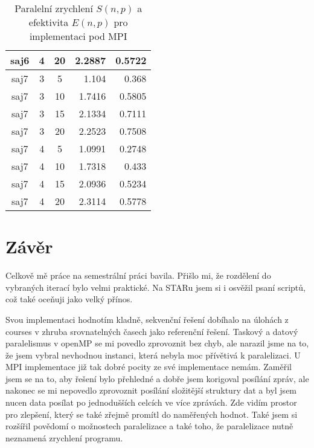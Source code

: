 \documentclass{article} \oddsidemargin=-5mm
\begin{document}
\begin{table}[h]
\begin{tabular}{|c|c|c|r|r|}
saj6                    & 4                        & 20                    & 2.2887          & 0.5722          \\ \hline
saj7                    & 3                        & 5                     & 1.104           & 0.368           \\ \hline
saj7                    & 3                        & 10                    & 1.7416          & 0.5805          \\ \hline
saj7                    & 3                        & 15                    & 2.1334          & 0.7111          \\ \hline
saj7                    & 3                        & 20                    & 2.2523          & 0.7508          \\ \hline
saj7                    & 4                        & 5                     & 1.0991          & 0.2748          \\ \hline
saj7                    & 4                        & 10                    & 1.7318          & 0.433           \\ \hline
saj7                    & 4                        & 15                    & 2.0936          & 0.5234          \\ \hline
saj7                    & 4                        & 20                    & 2.3114          & 0.5778          \\ \hline
\end{tabular}
\caption{Paralelní zrychlení $S(n,p)$ a efektivita $E(n,p)$ pro implementaci pod MPI}
\label{mpi-efectivity}
\end{table}

\clearpage

\section{Závěr}

Celkově mě práce na semestrální práci bavila. Přišlo mi, že rozdělení do vybraných iterací bylo velmi praktické. Na STARu jsem si i osvěžil psaní scriptů, což také oceňuji jako velký přínos.

Svou implementaci hodnotím kladně, sekvenční řešení dobíhalo na úlohách z courses v zhruba srovnatelných časech jako referenční řešení. Taskový a datový paralelismus v openMP se mi povedlo zprovoznit bez chyb, ale narazil jsme na to, že jsem vybral nevhodnou instanci, která nebyla moc přívětivá k paralelizaci. U MPI implementace již tak dobré pocity ze své implementace nemám. Zaměřil jsem se na to, aby řešení bylo přehledné a dobře jsem korigoval posílání zpráv, ale nakonec se mi nepovedlo zprovoznit posílání složitější struktury dat a byl jsem nucen data posílat po jednodušších celcích ve více zprávách. Zde vidím prostor pro zlepšení, který se také zřejmě promítl do naměřených hodnot. Také jsem si rozšířil povědomí o možnostech paralelizace a také toho, že paralelizace nutně neznamená zrychlení programu.
\end{document}
